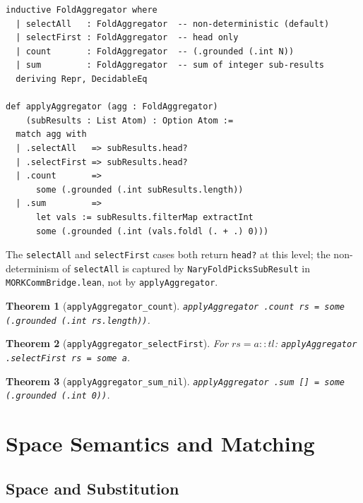 \documentclass[11pt]{article}
\newtheorem{theorem}{Theorem}[section]
\theoremstyle{definition}
\theoremstyle{remark}
\begin{document}
\begin{lstlisting}[caption={Fold aggregator (\texttt{Syntax.lean}).}]
inductive FoldAggregator where
  | selectAll   : FoldAggregator  -- non-deterministic (default)
  | selectFirst : FoldAggregator  -- head only
  | count       : FoldAggregator  -- (.grounded (.int N))
  | sum         : FoldAggregator  -- sum of integer sub-results
  deriving Repr, DecidableEq

def applyAggregator (agg : FoldAggregator)
    (subResults : List Atom) : Option Atom :=
  match agg with
  | .selectAll   => subResults.head?
  | .selectFirst => subResults.head?
  | .count       =>
      some (.grounded (.int subResults.length))
  | .sum         =>
      let vals := subResults.filterMap extractInt
      some (.grounded (.int (vals.foldl (. + .) 0)))
\end{lstlisting}

\noindent
The \texttt{selectAll} and \texttt{selectFirst} cases both return
\texttt{head?} at this level; the non-determinism of \texttt{selectAll} is
captured by \texttt{NaryFoldPicksSubResult} in \texttt{MORKCommBridge.lean},
not by \texttt{applyAggregator}.

\begin{theorem}[\texttt{applyAggregator\_count}]
\texttt{applyAggregator .count rs = some (.grounded (.int rs.length))}.
\end{theorem}

\begin{theorem}[\texttt{applyAggregator\_selectFirst}]
For $\mathit{rs} = a :: \mathit{tl}$:
\texttt{applyAggregator .selectFirst rs = some a}.
\end{theorem}

\begin{theorem}[\texttt{applyAggregator\_sum\_nil}]
\texttt{applyAggregator .sum [] = some (.grounded (.int 0))}.
\end{theorem}

\section{Space Semantics and Matching}
\label{sec:space}

\subsection{Space and Substitution}
\end{document}

